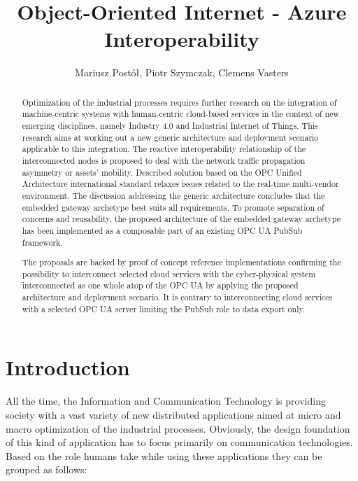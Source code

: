 \documentclass{jacsart}
\title{Object-Oriented Internet - Azure Interoperability}
\author{Mariusz Postół\inst{1}, Piotr Szymczak\inst{1}, Clemens Vasters\inst{2}}
\affiliation
{
 \inst{1}Lodz University of Technology\\
 Institute of Information Technology\\
 ul. Wólczańska 215, 90-924 Lodz, Poland\\
 mailto:mariusz.postol@p.lodz.pl
 \andinst
 \inst{2}Microsoft\\
 Faculty/Department/Office Name\\
 Postal Address with the zip-code\\
 clemensv@microsoft.com
}
\begin{document}
\maketitle

\begin{abstract}

      Optimization of the industrial processes requires further research on the integration of machine-centric systems with human-centric cloud-based services in the context of new emerging disciplines, namely Industry 4.0 and Industrial Internet of Things. This research aims at working out a new generic architecture and deployment scenario applicable to this integration. The reactive interoperability relationship of the interconnected nodes is proposed to deal with the network traffic propagation asymmetry or assets' mobility. Described solution based on the OPC Unified Architecture international standard relaxes issues related to the real-time multi-vendor environment. The discussion addressing the generic architecture concludes that the embedded gateway archetype best suits all requirements. To promote separation of concerns and reusability, the proposed architecture of the embedded gateway archetype has been implemented as a composable part of an existing OPC UA PubSub framework.

      The proposals are backed by proof of concept reference implementations confirming the possibility to interconnect selected cloud services with the cyber-physical system interconnected as one whole atop of the OPC UA by applying the proposed architecture and deployment scenario. It is contrary to interconnecting cloud services with a selected OPC UA server limiting the PubSub role to data export only.

\end{abstract}

\maketitle


\section{Introduction}\label{introduction}

All the time, the Information and Communication Technology is providing society with a vast variety of new distributed applications aimed at micro and macro optimization of the industrial processes. Obviously, the design foundation of this kind of application has to focus primarily on communication technologies. Based on the role humans take while using these applications they can be grouped as follows:
\end{document}
